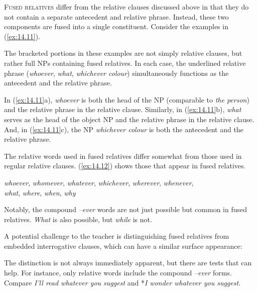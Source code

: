 \textsc{Fused relatives} differ from the relative clauses discussed above in that they do not contain a separate antecedent and relative phrase. Instead, these two components are fused into a single constituent. Consider the examples in (\ref{ex:14.11}).

\ea \label{ex:14.11}
    \z
\z

The bracketed portions in these examples are not simply relative clauses, but rather full NPs containing fused relatives. In each case, the underlined relative phrase (\textit{whoever}, \textit{what}, \textit{whichever colour}) simultaneously functions as the antecedent and the relative phrase.

In (\ref{ex:14.11}a), \textit{whoever} is both the head of the NP (comparable to \textit{the person}) and the relative phrase in the relative clause. Similarly, in (\ref{ex:14.11}b), \textit{what} serves as the head of the object NP and the relative phrase in the relative clause. And, in (\ref{ex:14.11}c), the NP \textit{whichever colour} is both the antecedent and the relative phrase.

The relative words used in fused relatives differ somewhat from those used in regular relative clauses. (\ref{ex:14.12}) shows those that appear in fused relatives. 

\ea \textit{whoever}, \textit{whomever}, \textit{whatever}, \textit{whichever}, \textit{wherever}, \textit{whenever}, \\\textit{what}, \textit{where}, \textit{when}, \textit{why}\label{ex:14.12}
\z

Notably, the compound \textit{--ever} words are not just possible but common in fused relatives. \textit{What} is also possible, but \textit{while} is not. 

A potential challenge to the teacher is distinguishing fused relatives from embedded interrogative clauses, which can have a similar surface appearance:
\ea \label{ex:14.14}
    \z
\z

The distinction is not always immediately apparent, but there are tests that can help. For instance, only relative words include the compound \textit{--ever} forms. Compare \textit{I'll read whatever you suggest} and *\textit{I wonder whatever you suggest}.

